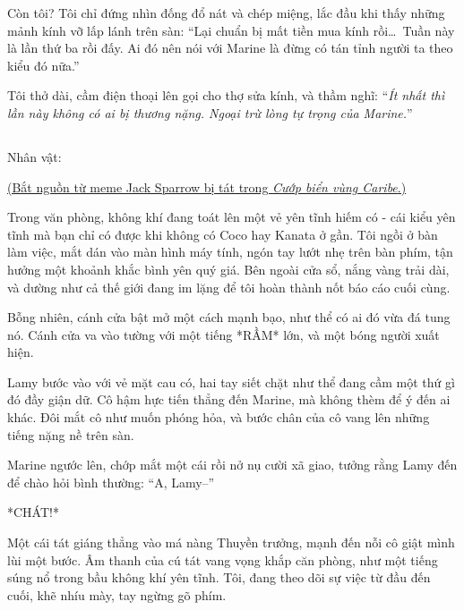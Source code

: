 \documentclass[../main.tex]{subfiles}
\begin{document}
Còn tôi? Tôi chỉ đứng nhìn đống đổ nát và chép miệng, lắc đầu khi thấy những mảnh kính vỡ lấp lánh trên sàn: ``Lại chuẩn bị mất tiền mua kính rồi\dots\ Tuần này là lần thứ ba rồi đấy. Ai đó nên nói với Marine là đừng có tán tỉnh người ta theo kiểu đó nữa.''

Tôi thở dài, cầm điện thoại lên gọi cho thợ sửa kính, và thầm nghĩ: ``\textit{Ít nhất thì lần này không có ai bị thương nặng. Ngoại trừ lòng tự trọng của Marine.}''

\newpage

\subsection*{\label{ep-S16.IV}}
\vspace{-4pt}
\begin{center}
    {\caviar\fontsize{12pt}{12pt}\selectfont Nhân vật:    }
\end{center}

\begin{center}
    \uline{(Bắt nguồn từ meme Jack Sparrow bị tát trong \textit{Cướp biển vùng Caribe}.)}
\end{center}

Trong văn phòng, không khí đang toát lên một vẻ yên tĩnh hiếm có - cái kiểu yên tĩnh mà bạn chỉ có được khi không có Coco hay Kanata ở gần. Tôi ngồi ở bàn làm việc, mắt dán vào màn hình máy tính, ngón tay lướt nhẹ trên bàn phím, tận hưởng một khoảnh khắc bình yên quý giá. Bên ngoài cửa sổ, nắng vàng trải dài, và dường như cả thế giới đang im lặng để tôi hoàn thành nốt báo cáo cuối cùng.

Bỗng nhiên, cánh cửa bật mở một cách mạnh bạo, như thể có ai đó vừa đá tung nó. Cánh cửa va vào tường với một tiếng *RẦM* lớn, và một bóng người xuất hiện.

Lamy bước vào với vẻ mặt cau có, hai tay siết chặt như thể đang cầm một thứ gì đó đầy giận dữ. Cô hậm hực tiến thẳng đến Marine, mà không thèm để ý đến ai khác. Đôi mắt cô như muốn phóng hỏa, và bước chân của cô vang lên những tiếng nặng nề trên sàn.


Marine ngước lên, chớp mắt một cái rồi nở nụ cười xã giao, tưởng rằng Lamy đến để chào hỏi bình thường: ``A, Lamy--''

*CHÁT!*

Một cái tát giáng thẳng vào má nàng Thuyền trưởng, mạnh đến nỗi cô giật mình lùi một bước. Âm thanh của cú tát vang vọng khắp căn phòng, như một tiếng súng nổ trong bầu không khí yên tĩnh. Tôi, đang theo dõi sự việc từ đầu đến cuối, khẽ nhíu mày, tay ngừng gõ phím.
\end{document}
